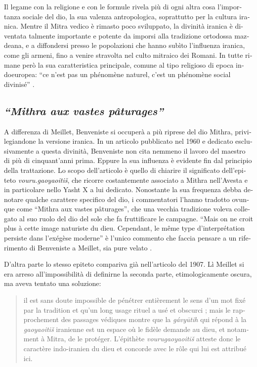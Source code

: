 \documentclass[french,output=paper,colorlinks,citecolor=brown]{../langscibook}
\begin{document}
\begin{otherlanguage}{italian}
Il legame con la religione e con le formule rivela più di ogni altra cosa l’importanza sociale del dio, la sua valenza antropologica, soprattutto per la cultura iranica. Mentre il Mitra vedico è rimasto poco sviluppato, la divinità iranica è diventata talmente importante e potente da imporsi alla tradizione ortodossa mazdeana, e a diffondersi presso le popolazioni che hanno subìto l’influenza iranica, come gli armeni, fino a venire stravolta nel culto mitraico dei Romani. In tutte rimane però la sua caratteristica principale, comune al tipo religioso di epoca indoeuropea: “ce n’est pas un phénomène naturel, c’est un phénomène social divinisé” \citep[159]{Meillet1907}.

\subsection{\textit{“Mithra aux vastes pâturages”}}

A differenza di Meillet, Benveniste si occuperà a più riprese del dio Mithra, privilegiandone la versione iranica. In un articolo pubblicato nel 1960 e dedicato esclusivamente a questa divinità, Benveniste non cita nemmeno il lavoro del maestro di più di cinquant’anni prima. Eppure la sua influenza è evidente fin dal principio della trattazione. Lo scopo dell’articolo è quello di chiarire il significato dell’epiteto \textit{vouru.gaoyaoitiš}, che ricorre costantemente associato a Mithra nell’Avesta e in particolare nello Yasht X a lui dedicato. Nonostante la sua frequenza debba denotare qualche carattere specifico del dio, i commentatori l’hanno tradotto ovunque come “Mithra aux vastes pâturages”, che una vecchia tradizione voleva collegato al suo ruolo del dio del sole che fa fruttificare le campagne. “Mais on ne croit plus à cette image naturiste du dieu. Cependant, le même type d’interprétation persiste dans l’exégèse moderne” è l’unico commento che faccia pensare a un riferimento di Benveniste a Meillet, sia pure velato \citep[277]{Benveniste2015}.

D’altra parte lo stesso epiteto compariva già nell’articolo del 1907. Lì Meillet si era arreso all’impossibilità di definirne la seconda parte, etimologicamente oscura, ma aveva tentato una soluzione:

\begin{quote}
il est sans doute impossible de pénétrer entièrement le sens d’un mot fixé par la tradition et qu’un long usage rituel a usé et obscurci ; mais le rapprochement des passages védiques montre que la \textit{gávyūtih} qui répond à la \textit{gaoyaoitiš} iranienne est un espace où le fidèle demande au dieu, et notamment à Mitra, de le protéger. L’épithète \textit{vourugaoyaoitiš} atteste donc le caractère indo-iranien du dieu et concorde avec le rôle qui lui est attribué ici. \citep[156]{Meillet1907}
\end{quote}


\end{otherlanguage}
\end{document}
